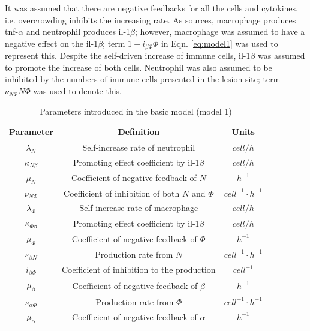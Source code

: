 It was assumed that there are negative feedbacks for all the cells and cytokines, i.e. overcrowding inhibits the increasing rate. As sources, macrophage produces tnf-$\alpha$ and neutrophil produces il-1$\beta$; however, macrophage was assumed to have a negative effect on the il-1$\beta$; term $1+i_{\beta\Phi}\Phi$ in Eqn. \ref{eq:model1} was used to represent this. Despite the self-driven increase of immune cells, il-1$\beta$ was assumed to promote the increase of both cells. Neutrophil was also assumed to be inhibited by the numbers of immune cells presented in the lesion site; term $\nu_{N\Phi}N\Phi$ was used to denote this.

\begin{table}[t]
    \centering
    \begin{tabular}{|c c c|}
        \hline
        Parameter            & Definition                                       & Units                    \\ [0.5ex]
        \hline\hline
        $\lambda_N$          & Self-increase rate of neutrophil                 & $cell/h$                 \\
        $\kappa_{N\beta}$    & Promoting effect coefficient by il-1$\beta$      & $cell/h$                 \\
        $\mu_N$              & Coefficient of negative feedback of $N$          & $h^{-1}$                 \\
        $\nu_{N\Phi}$        & Coefficient of inhibition of both $N$ and $\Phi$ & $cell^{-1}\cdotp h^{-1}$ \\
        \hline
        $\lambda_\Phi$       & Self-increase rate of macrophage                 & $cell/h$                 \\
        $\kappa_{\Phi\beta}$ & Promoting effect coefficient by il-1$\beta$      & $cell/h$                 \\
        $\mu_\Phi$           & Coefficient of negative feedback of $\Phi$       & $h^{-1}$                 \\
        \hline
        $s_{\beta N}$        & Production rate from $N$                         & $cell^{-1}\cdotp h^{-1}$ \\
        $i_{\beta\Phi}$      & Coefficient of inhibition to the production      & $cell^{-1}$              \\
        $\mu_\beta$          & Coefficient of negative feedback of $\beta$      & $h^{-1}$                 \\
        \hline
        $s_{\alpha\Phi}$     & Production rate from $\Phi$                      & $cell^{-1}\cdotp h^{-1}$ \\
        $\mu_\alpha$         & Coefficient of negative feedback of $\alpha$     & $h^{-1}$                 \\
        \hline
    \end{tabular}
    \caption{Parameters introduced in the basic model (model 1)}
    \label{table:m1}
\end{table}

